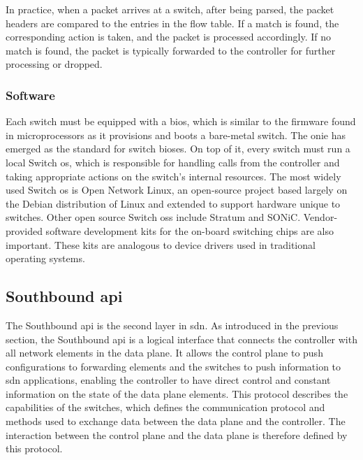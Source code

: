In practice, when a packet arrives at a switch, after being parsed, the packet headers are compared to the entries in the flow table. If a match is found, the corresponding action is taken, and the packet is processed accordingly. If no match is found, the packet is typically forwarded to the controller for further processing or dropped.

\subsubsection{Software}

Each switch must be equipped with a \gls{bios}, which is similar to the firmware found in microprocessors as it provisions and boots a bare-metal switch. The \gls{onie} has emerged as the standard for switch \gls{bios}es\cite{peterson_software-defined_2021}. On top of it, every switch must run a local Switch \gls{os}, which is responsible for handling calls from the controller and taking appropriate actions on the switch's internal resources. The most widely used Switch \gls{os} is Open Network Linux\cite{noauthor_linux_nodate}, an open-source project based largely on the Debian distribution of Linux and extended to support hardware unique to switches\cite{peterson_software-defined_2021}. Other open source Switch \glspl{os} include Stratum\cite{noauthor_stratum_nodate} and SONiC\cite{noauthor_sonic_nodate}. Vendor-provided software development kits for the on-board switching chips are also important. These kits are analogous to device drivers used in traditional operating systems. 


\subsection[Southbound API]{Southbound \gls{api}} %

The Southbound \gls{api} is the second layer in \gls{sdn}. As introduced in the previous section, the Southbound \gls{api} is a logical interface that connects the controller with all network elements in the data plane\cite{thyagaturu_software_2016}. It allows the control plane to push configurations to forwarding elements and the switches to push information to \gls{sdn} applications, enabling the controller to have direct control and constant information on the state of the data plane elements. 
This protocol describes the capabilities of the switches, which defines the communication protocol and methods used to exchange data between the data plane and the controller. The interaction between the control plane and the data plane is therefore defined by this protocol\cite{kreutz_software-defined_2015}. 

